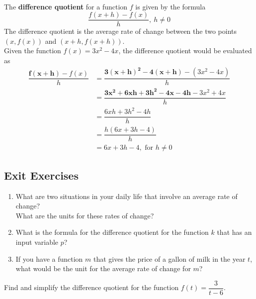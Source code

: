 \begin{myDefinition}~\\[0.5mm]
The {\bf difference quotient} for a function $f$ is given by the formula
\[ \dfrac{f(x+h)-f(x)}{h}, ~ h\neq0\]  
The difference quotient is the average rate of change between the two points $(x,f(x))$ and $(x+h, f(x+h))$.\\[0.5em]
 Given the function $f(x) = 3x^2-4x$, the difference quotient would be evaluated as 
$$\begin{aligned}
\dfrac{\boldsymbol{f(x+h)}-f(x)}{h} &= \dfrac{\boldsymbol{3(x+h)^2-4(x+h)} - \left(3x^2-4x\right)}{h}\\[0.5em]
&= \dfrac{\boldsymbol{3x^2 + 6xh + 3h^2 -4x -4h}  - 3x^2+4x}{h}\\[0.5em]
&=  \dfrac{6xh + 3h^2 -4h }{h}\\[0.5em]
&=  \dfrac{h(6x + 3h -4) }{h}\\[0.5em]
&=  6x + 3h -4,  \text{ for $h\neq0$}
\end{aligned}$$
\end{myDefinition}


 \newpage

\subsection*{Exit Exercises} \label{exit-difference-quotient}


\begin{myExit}
\begin{enumerate}
		\item What are two situations in your daily life that involve an average rate of change?  \\
		What are the units for these rates of change?
		\vfill
		\vfill
		\item What is the formula for the difference quotient for the function $k$ that has an input variable $p$?
		\vfill
		\vfill
		\item If you have a function $m$ that gives the price of a gallon of milk in the year $t$, what would be the unit for the average rate of change for $m$?
		\vfill
		\vfill
		\vfill
		\vfill
		\end{enumerate}
\end{myExit}

\newpage

\begin{myExit}
	Find and simplify the difference quotient for the function $f(t) = \dfrac{3}{t-6}$.
	\vfill
\end{myExit}



